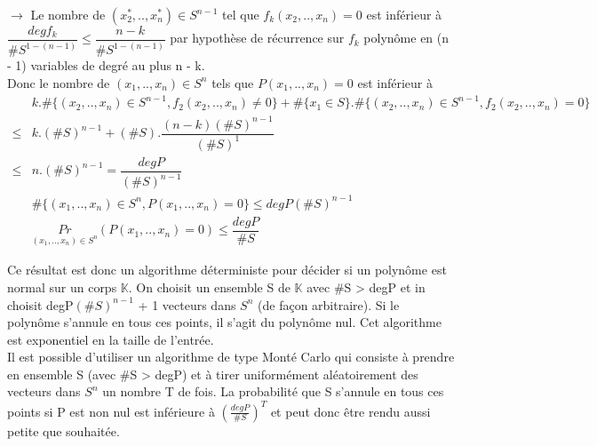 \documentclass[12pt,a4paper]{article}
\begin{document}
\begin{itemize}
	$\rightarrow$ Le nombre de $(x_2^*, .., x_n^*) \in S^{n - 1}$ tel que $f_k(x_2, .., x_n) = 0$ est inférieur à\\ $\dfrac{degf_k}{\#S^{1 - (n - 1)}} \leq \dfrac{n - k}{\#S^{1 - (n - 1)}}$ par hypothèse de récurrence sur $f_k$ polynôme en (n - 1) variables de degré au plus n - k.\\
	Donc le nombre de $(x_1, .., x_n) \in S^n$ tels que $P(x_1, .., x_n) = 0$ est inférieur à
	\begin{equation}
	\begin{split}\nonumber
	& k.\#\{(x_2, .., x_n) \in S^{n - 1}, f_2(x_2, .., x_n) \neq 0\} + \#\{x_1 \in S\}.\#\{(x_2, .., x_n) \in S^{n - 1}, f_2(x_2, .., x_n) = 0\}\\
	\leq & k.(\#S)^{n - 1} + (\#S).\dfrac{(n - k)(\#S)^{n - 1}}{(\#S)^1}\\
	\leq &n.(\#S)^{n - 1} = \dfrac{degP}{(\#S)^{n - 1}}\\
	& \#\{(x_1, .., x_n) \in S^n, P(x_1, .., x_n) = 0\} \leq degP(\#S)^{n - 1}\\
	& \underset{(x_1, .., x_n)\in S^n}{Pr} (P(x_1, .., x_n) = 0) \leq \dfrac{degP}{\#S}
	\end{split}
	\end{equation}
\end{itemize}
Ce résultat est donc un algorithme déterministe pour décider si un polynôme est normal sur un corps $\mathbb{K}$. On choisit un ensemble S de $\mathbb{K}$ avec \#S > degP et in choisit degP$(\#S)^{n - 1}$ + 1 vecteurs dans $S^n$ (de façon arbitraire). Si le polynôme s'annule en tous ces points, il s'agit du polynôme nul. Cet algorithme est exponentiel en la taille de l'entrée.\\
Il est possible d'utiliser un algorithme de type Monté Carlo qui consiste à prendre en ensemble S (avec \#S > degP) et à tirer uniformément aléatoirement des vecteurs dans $S^n$ un nombre T de fois. La probabilité que S s'annule en tous ces points si P est non nul est inférieure à $(\frac{degP}{\#S})^T$ et peut donc être rendu aussi petite que souhaitée.
\end{document}
